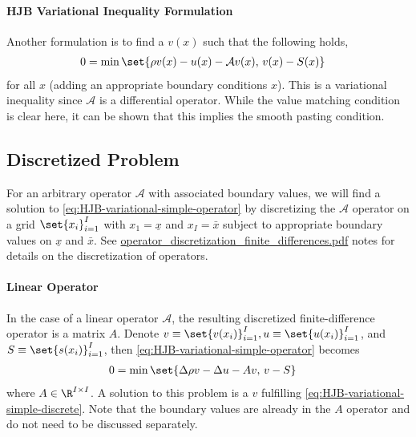 \documentclass[11pt]{etk-article}
\begin{document}
\paragraph{HJB Variational Inequality Formulation}
Another formulation is to find a $v(x)$ such that the following holds,
\begin{align}
	0 &= \min\set{\rho v(x) - u(x) - \mathcal{A} v(x),\, v(x) - S(x) }\label{eq:HJB-variational-simple-operator}
\end{align}	
for all $x$ (adding an appropriate boundary conditions $x$).  This is a variational inequality since $\mathcal{A}$ is a differential operator.  While the value matching condition is clear here, it can be shown that this implies the smooth pasting condition.


\subsection{Discretized Problem}
For an arbitrary operator $\mathcal{A}$ with associated boundary values, we will find a solution to \cref{eq:HJB-variational-simple-operator} by discretizing the $\mathcal{A}$ operator on a grid $\set{x_i}_{i=1}^I$ with $x_1 = \underline{x}$ and $x_I = \bar{x}$ subject to appropriate boundary values on $\underline{x}$ and $\bar{x}$.  See \url{operator_discretization_finite_differences.pdf} notes for details on the discretization of operators.
\paragraph{Linear Operator}
In the case of a linear operator $\mathcal{A}$, the resulting discretized finite-difference operator is a matrix $A$.  Denote $v \equiv \set{v(x_i)}_{i=1}^I, u \equiv \set{u(x_i)}_{i=1}^I$, and $S \equiv \set{s(x_i)}_{i=1}^I$, then \cref{eq:HJB-variational-simple-operator} becomes
\begin{align}
	0 &= \min\set{\Delta \rho v - \Delta u - A v,\, v - S }\label{eq:HJB-variational-simple-discrete}
\end{align}
where $A\in\R^{I\times I}$.  A solution to this problem is a $v$ fulfilling \cref{eq:HJB-variational-simple-discrete}.  Note that the boundary values are already in the $A$ operator and do not need to be discussed separately.
\end{document}
